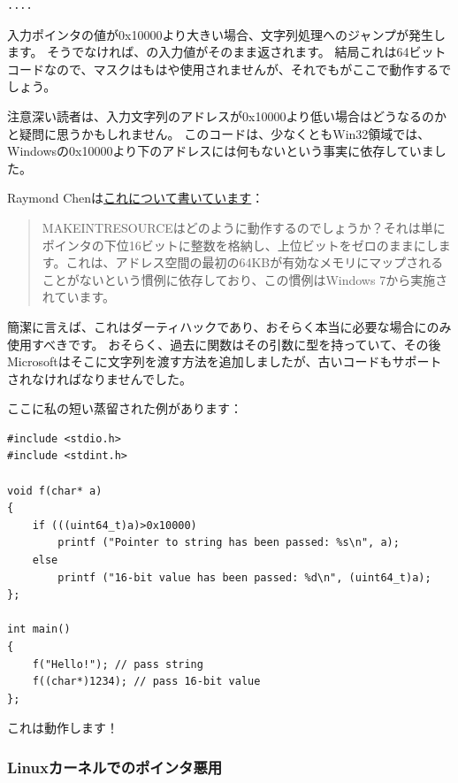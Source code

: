\begin{lstlisting}[style=customasmx86]
....

\end{lstlisting}

入力ポインタの値が0x10000より大きい場合、文字列処理へのジャンプが発生します。
そうでなければ、の入力値がそのまま返されます。
結局これは64ビットコードなので、マスクはもはや使用されませんが、それでもがここで動作するでしょう。

注意深い読者は、入力文字列のアドレスが0x10000より低い場合はどうなるのかと疑問に思うかもしれません。
このコードは、少なくともWin32領域では、Windowsの0x10000より下のアドレスには何もないという事実に依存していました。

Raymond Chenは\href{https://blogs.msdn.microsoft.com/oldnewthing/20130925-00/?p=3123}{これについて書いています}：

\begin{framed}
\begin{quotation}
MAKE­INT­RESOURCEはどのように動作するのでしょうか？それは単にポインタの下位16ビットに整数を格納し、上位ビットをゼロのままにします。これは、アドレス空間の最初の64KBが有効なメモリにマップされることがないという慣例に依存しており、この慣例はWindows 7から実施されています。
\end{quotation}
\end{framed}

簡潔に言えば、これはダーティハックであり、おそらく本当に必要な場合にのみ使用すべきです。
おそらく、過去に関数はその引数に型を持っていて、その後Microsoftはそこに文字列を渡す方法を追加しましたが、古いコードもサポートされなければなりませんでした。

ここに私の短い蒸留された例があります：

\begin{lstlisting}[style=customc]
#include <stdio.h>
#include <stdint.h>

void f(char* a)
{
	if (((uint64_t)a)>0x10000)
		printf ("Pointer to string has been passed: %s\n", a);
	else
		printf ("16-bit value has been passed: %d\n", (uint64_t)a);
};

int main()
{
	f("Hello!"); // pass string
	f((char*)1234); // pass 16-bit value
};
\end{lstlisting}

これは動作します！

\subsubsection{Linuxカーネルでのポインタ悪用}

